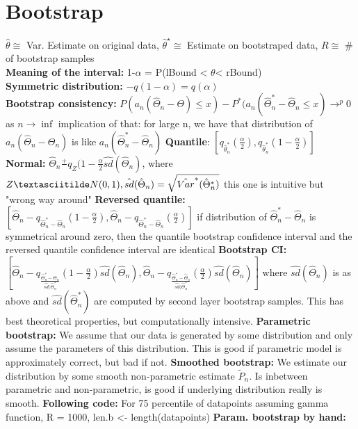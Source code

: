 \section{Bootstrap}
$\hat{\theta} \cong$ Var. Estimate on original data, $\hat{\theta}^\star \cong$ Estimate on bootstraped data, $R \cong$ \# of bootstrap samples \\
\textbf{Meaning of the interval:} 1-$\alpha$ = P(lBound < $\theta $< rBound)\\
\textbf{Symmetric distribution:} $-q(1-\alpha) = q(\alpha) $ \\
\textbf{Bootstrap consistency: }$P(a_n(\hat\Theta_n-\Theta) \leq x)-P^*(a_n(\hat\Theta_n^*-\hat\Theta_n \leq x) \rightarrow^p 0$ as $n \rightarrow \inf$ implication of that: for large n, we have that distribution of $a_n(\hat\Theta_n - \Theta_n)$ is like $a_n(\hat\Theta^*_n- \hat\Theta_n)$
\textbf{Quantile}: $[q_{\hat\theta_n^*}(\frac{\alpha}{2}),q_{\hat\theta_n^*}(1-\frac{\alpha}{2})]$
\textbf{Normal: }$\hat\Theta_n \frac{+}{} q_Z(1-\frac{\alpha}{2}\hat{sd}(\hat\Theta_n)$, where $Z \textasciitilde N(0,1), \hat{sd}(\hat \Theta_n) = \sqrt{\hat{Var}^*(\hat{\Theta}_n^*)}$ this one is intuitive but "wrong way around"
\textbf{Reversed quantile: } $[\hat\Theta_n - q_{\hat\Theta_n^*-\hat\Theta_n}(1-\frac{\alpha}{2}), \hat\Theta_n - q_{\hat\Theta_n^*-\hat\Theta_n}(\frac{\alpha}{2})]$  if distribution of $\hat \Theta_n^*- \hat \Theta_n$ is symmetrical around zero, then the quantile bootstrap confidence interval and the reversed quantile confidence interval are identical 
\textbf{Bootstrap CI: }$[\hat\Theta_n - q_{\frac{\hat\Theta_n^*-\hat\Theta_n}{\hat{sd}(\hat\Theta_n^*}}(1-\frac{\alpha}{2})\hat{sd}(\hat\Theta_n), \hat\Theta_n - q_{\frac{\hat\Theta_n^*-\hat\Theta_n}{\hat{sd}(\hat\Theta_n^*}}(\frac{\alpha}{2})\hat{sd}(\hat\Theta_n)]$ where $\hat{sd}(\hat\Theta_n)$ is as above and $\hat{sd}(\hat\Theta_n^*)$ are computed by second layer bootstrap samples. This has best theoretical properties, but computationally intensive. 
\textbf{Parametric bootstrap: } We assume that our data is generated by some distribution and only assume the parameters of this distribution. This is good if parametric model is approximately correct, but bad if not. 
\textbf{Smoothed bootstrap: } We estimate our distribution by some smooth non-parametric estimate $\tilde P_n$. Is inbetween parametric and non-parametric, is good if underlying distribution really is smooth. 
\textbf{Following code:} For 75 percentile of datapoints assuming gamma function, R = 1000, len.b <- length(datapoints)
\textbf{Param. bootstrap by hand:}
